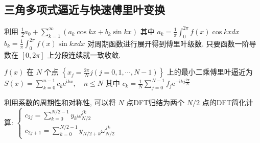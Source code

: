 \documentclass[10pt]{yerbaformat}
\begin{document}
\subsection{三角多项式逼近与快速傅里叶变换}
\par 利用 $\frac{1}{2} a_{0}+\sum_{k=1}^{\infty}\left(a_{k} \cos k x+b_{k} \sin k x\right)$ 其中 $a_{k}=\frac{1}{\pi} \int_{0}^{2 \pi} f(x) \cos k x d x$
$b_{k}=\frac{1}{\pi} \int_{0}^{2 \pi} f(x) \sin k x d x$ 对周期函数进行展开得到傅里叶级数. 只要函数一阶导数在 $[0,2\pi]$ 上分段连续就一致收敛.

\par $f(x)$ 在 $N$ 个点 $\left\{x_{j}=\frac{2 \pi}{N} j(j=0,1, \cdots, N-1)\right\}$ 上的最小二乘傅里叶逼近为 $S(x)=\sum_{k=0}^{n-1} c_{k} \mathrm{e}^{\mathrm{i} k x}, \quad n \leq N$ 其中 $c_{k}=\frac{1}{N} \sum_{j=0}^{N-1} f_{j} \mathrm{e}^{-\mathrm{i} k j \frac{2 \pi}{N}}$

\par 利用系数的周期性和对称性, 可以将 $N$ 点DFT归结为两个 $N/2$ 点的DFT简化计算: $\left\{\begin{array}{l}c_{2 j}=\sum_{k=0}^{N / 2-1} y_{k} \omega_{N / 2}^{j k} \\ c_{2 j+1}=\sum_{k=0}^{N / 2-1} y_{N / 2+k} \omega_{N / 2}^{j k}\end{array}\right.$
\end{document}
